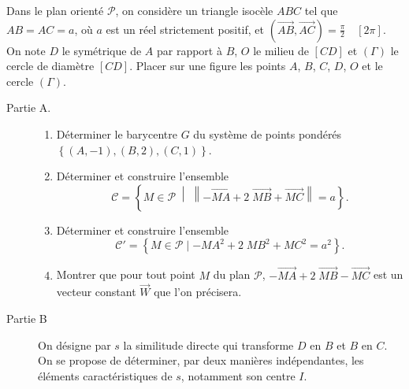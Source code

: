\begin{exo}
      Dans le plan orient\'e $\mathscr{P}$, on consid\`ere un triangle isoc\`ele $ABC$ tel que $AB = AC = a$, 
      o\`u $a$ est un r\'eel strictement positif, et $ \left( \overrightarrow{AB},\overrightarrow{AC} \right) = \frac{\pi}{2} \quad [2 \pi]$.
      On note $D$ le sym\'etrique de $A$ par rapport \`a $B$, $O$ le milieu de $[CD]$ et 
      $(\Gamma)$ le cercle de diam\`etre $[CD]$. 
      Placer sur une figure les points $A$, $B$, $C$, $D$, $O$ et le cercle $(\Gamma)$.       
      \begin{description}
            \item[Partie A.]
                  \begin{enumerate}
                        \item D\'eterminer le barycentre $G$ du syst\`eme de points pond\'er\'es 
                              $\left\lbrace (A,-1) , (B , 2) , (C , 1) \right\rbrace$.
	                        \item D\'eterminer et construire l'ensemble 
	                              \[
	                              \mathscr{C} = \left\lbrace M \in \mathscr{P} \;\middle|\; \left\| - 
	                              \overrightarrow{MA} + 2 \; \overrightarrow{MB} + \overrightarrow{MC} \right\| = a \right\rbrace.
	                              \]
	                        \item D\'eterminer et construire l'ensemble 
	                              \[
	                              \mathscr{C}' = \left\lbrace M \in \mathscr{P} \mid 
	                              -{MA}^2 + 2 \; {MB}^2 + {MC}^2 = a^2 \right\rbrace.
	                              \]
                        \item Montrer que pour tout point $M$ du plan 
                              $\mathscr{P}$, $-\overrightarrow{MA} + 2 \; \overrightarrow{MB} - \overrightarrow{MC}$ 
	                              est un vecteur constant $\overrightarrow{W}$ que l'on pr\'ecisera.
                  \end{enumerate}
            \item[Partie B]
                  On d\'esigne par $s$ la similitude directe qui transforme $D$ en $B$ et $B$ en $C$. 
                  On se propose de d\'eterminer, par deux mani\`eres ind\'ependantes, 
                  les \'el\'ements caract\'eristiques de $s$, notamment son centre $I$.
                  

\end{description}
\end{exo}
